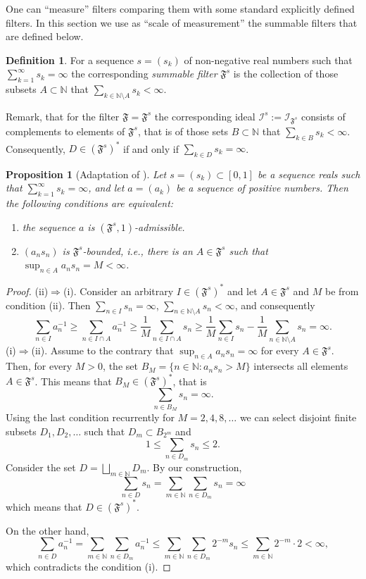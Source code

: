 \documentclass[11pt,twoside, reqno]{amsart}
\newcommand{\N}{{\mathbb N}}
\newcommand{\F}{\mathfrak{F}}
\theoremstyle{plain}
\newtheorem{proposition}[theorem]{Proposition}
\theoremstyle{remark}
\theoremstyle{definition}
\newtheorem{definition}[theorem]{Definition}
\numberwithin{equation}{section}
\begin{document}
One can ``measure'' filters comparing them with some standard explicitly defined filters. In this section we use as ``scale of measurement'' the summable filters that are defined below.

\begin{definition} \label{defsum-fil}
For a sequence $s=(s_k)$ of non-negative real numbers such that $\sum_{k=1}^{\infty} s_k=\infty$ the corresponding \textit{summable filter} $\F^{s}$ is the collection of those subsets $A\subset{\mathbb{N}}$ that $\sum_{k\in \N \setminus A} s_k < \infty$. 
\end{definition}

Remark, that for the filter  $\F = \F^{s}$ the corresponding ideal $\mathcal{I}^{s}:=\mathcal{I}_{\F^{s}}$ consists of complements to elements of $\F^{s}$, that is of those sets $B \subset \N$ that $\sum_{k\in B} s_k < \infty$. Consequently, $D \in \left(\F^{s}\right)^*$ if and only if $\sum_{k\in D} s_k = \infty$.

\begin{proposition}[{Adaptation of \cite[Corollary 5.16]{kaleor}}] \label{prop-sum-acc}
Let $s=(s_k) \subset [0, 1]$ be a sequence reals such that  $\sum_{k=1}^{\infty} s_k=\infty$, and let  $a=(a_k)$ be a sequence of positive numbers. Then the following conditions are equivalent:
\begin{enumerate}
\item[(i)] the sequence $a$ is $(\F^{s}, 1)$-admissible.

\item[(ii)] $(a_n s_n)$ is $\F^{s}$-bounded, i.e., there is an $A \in \F^{s}$ such that
$\sup_{n \in A}a_n s_n = M < \infty$.
\end{enumerate}
\end{proposition}
\begin{proof}
(ii)$\Longrightarrow$(i). Consider an arbitrary $I \in \left(\F^{s}\right)^*$ and let $A \in \F^{s}$ and $M$ be from condition (ii).  Then $\sum\limits_{n \in I} s_n = \infty$, $\sum\limits_{n \in \N \setminus A} s_n < \infty$, and consequently
$$
 \sum\limits_{n \in I} a_n^{-1} \ge  \sum\limits_{n \in I \cap A} a_n^{-1} \ge \frac1M  \sum\limits_{n \in I \cap A} s_n \ge \frac1M  \sum\limits_{n \in I} s_n - \frac1M  \sum\limits_{n \in \N \setminus A} s_n =  \infty.
$$
(i)$\Longrightarrow$(ii). Assume to the contrary that $\sup_{n \in A}a_n s_n = \infty$ for every $A \in \F^{s}$. Then, for every $M > 0$, the set $B_M = \{n \in \N: a_n s_n > M \}$ intersects all elements $A \in \F^{s}$. This means that $B_M \in (\F^{s})^*$, that is 
$$
\sum_{n \in B_M} s_n = \infty.
$$
Using the last condition recurrently for $M = 2, 4, 8, \ldots$ we can select disjoint finite subsets $D_1, D_2, \ldots$ such that $D_m \subset B_{2^m}$ and
$$
1 \le \sum_{n \in D_m} s_n \le 2.
$$
Consider the set $D = \bigsqcup_{m \in \N} D_m$. By our construction, 
$$
\sum_{n \in D} s_n = \sum_{m \in \N} \sum_{n \in D_m} s_n = \infty
$$
which means that $D \in (\F^{s})^*$.

On the other hand,
$$
\sum_{n \in D} a_n^{-1} = \sum_{m \in \N} \sum_{n \in D_m} a_n^{-1} \le  \sum_{m \in \N} \sum_{n \in D_m}2^{-m} s_n \le \sum_{m \in \N} 2^{-m} \cdot 2 < \infty,
$$
which contradicts the condition (i).
\end{proof}
\end{document}
